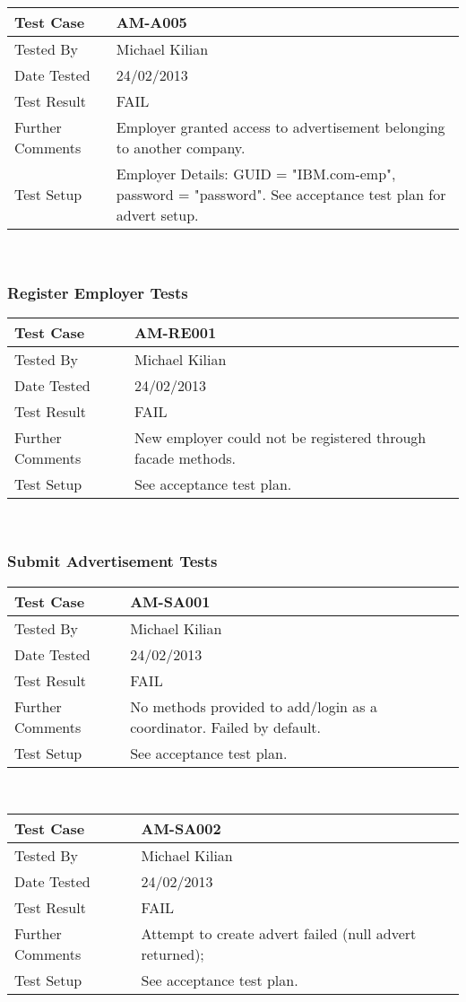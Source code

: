 \documentclass{l3deliverable}
\begin{document}
\begin{tabular}{lp{10cm}}
\hline 
\textbf{Test Case} & AM-A005\tabularnewline
\hline 
\hline 
Tested By & Michael Kilian\tabularnewline
\hline 
Date Tested & 24/02/2013\tabularnewline
\hline 
Test Result & FAIL\tabularnewline
\hline
Further Comments & Employer granted access to advertisement belonging to another company.\tabularnewline
\hline
Test Setup & Employer Details: GUID = "IBM.com-emp", password = "password". See acceptance test plan for advert setup.\tabularnewline
\hline
\end{tabular}\\

\subsubsection{Register Employer Tests}
\begin{tabular}{lp{10cm}}
\hline 
\textbf{Test Case} & AM-RE001\tabularnewline
\hline 
\hline 
Tested By & Michael Kilian\tabularnewline
\hline 
Date Tested & 24/02/2013\tabularnewline
\hline 
Test Result & FAIL\tabularnewline
\hline
Further Comments & New employer could not be registered through facade methods. \tabularnewline
\hline
Test Setup &  See acceptance test plan.\tabularnewline
\hline
\end{tabular}\\

\subsubsection{Submit Advertisement Tests}
\begin{tabular}{lp{10cm}}
\hline 
\textbf{Test Case} & AM-SA001\tabularnewline
\hline 
\hline 
Tested By & Michael Kilian\tabularnewline
\hline 
Date Tested & 24/02/2013\tabularnewline
\hline 
Test Result & FAIL\tabularnewline
\hline
Further Comments & No methods provided to add/login as a coordinator. Failed by default. \tabularnewline
\hline
Test Setup &  See acceptance test plan.\tabularnewline
\hline
\end{tabular}\\

\begin{tabular}{lp{10cm}}
\hline 
\textbf{Test Case} & AM-SA002\tabularnewline
\hline 
\hline 
Tested By & Michael Kilian\tabularnewline
\hline 
Date Tested & 24/02/2013\tabularnewline
\hline 
Test Result & FAIL\tabularnewline
\hline
Further Comments & Attempt to create advert failed (null advert returned); \tabularnewline
\hline
Test Setup &  See acceptance test plan.\tabularnewline
\hline
\end{tabular}\\
\end{document}
